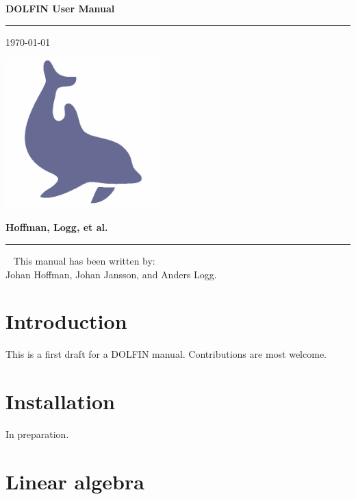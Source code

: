 \documentclass[12pt]{article}
\begin{document}

\thispagestyle{empty}

\Large
\textbf{DOLFIN User Manual} \\
\vspace{-0.5cm}
\hrule
\hfill
\small
\today

\vspace{3cm}

\begin{center}
\includegraphics[width=6cm]{eps/dolfin.eps}
\end{center}

\vfill

\normalsize
\textbf{Hoffman, Logg, et al.}
\hrule

\newpage


\ 
\vfill
This manual has been written by: \\
Johan Hoffman, Johan Jansson, and Anders Logg.
\thispagestyle{empty}

\cleardoublepage


\tableofcontents
\newpage

\cleardoublepage
\section{Introduction}

This is a first draft for a DOLFIN manual. Contributions are most welcome.

\cleardoublepage
\section{Installation}

In preparation.

\cleardoublepage
\section{Linear algebra}
\end{document}
